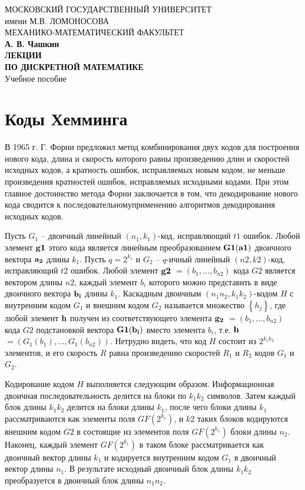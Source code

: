 \documentclass[12pt]{article}
\numberwithin{equation}{section}
\begin{document}
\begin{center}
\hfill \break
\large{МОСКОВСКИЙ ГОСУДАРСТВЕННЫЙ УНИВЕРСИТЕТ}\\
\footnotesize{имени М.В. ЛОМОНОСОВА}\\
\footnotesize{МЕХАНИКО-МАТЕМАТИЧЕСКИЙ ФАКУЛЬТЕТ}\\
\hfill \break
\small{\textbf{А. В. Чашкин}}\\
\small{\textbf{ЛЕКЦИИ}}\\
\small{\textbf{ПО ДИСКРЕТНОЙ МАТЕМАТИКЕ}}\\
\hfill \break
\normalsize{Учебное пособие}\
\end{center}
\newpage	
	\tableofcontents
	\newpage

	\section{Коды Хемминга}
	
	В 1965 г. Г. Форни предложил метод комбинирования двух кодов для построения нового кода, длина и скорость которого равны произведению длин и скоростей исходных кодов, а кратность ошибок, исправляемых новым кодом, не меньше произведения кратностей ошибок, исправляемых исходными кодами. При этом главное достоинство метода Форни заключается в том, что декодирование нового кода сводится к последовательномуприменению алгоритмов декодирования исходных кодов.
	
	
	Пусть $G_1$ -- двоичный линейный $(n_1, k_1)$-код, исправляющий $t1$ ошибок. Любой элемент $\bf g1$ этого кода является линейным преобразованием $\bf G1(a1)$ двоичного вектора $\bf a_2$ длины $k_1$. Пусть $q = 2^{{k}_{1}}$ и $G_2$ -- $q$-ичный линейный $(n2, k2)$-код, исправляющий $t2$ ошибок. Любой элемент $\bf g2$ $= (b_1,...,b_{n2} )$ кода $G2$ является вектором длины $n2$, каждый элемент $b_i$ которого можно представить в виде двоичного вектора $\bf b_i$ длины $k_1$. Каскадным двоичным
	$(n_1n_2, k_1k_2)$-кодом $H$ с внутренним кодом $G_1$ и внешним кодом $G_2$ называется множество $\left\{{h}_{j}\right\}$, где любой элемент $\bf h$ получен из соответствующего элемента $\bf g_2$ 
	$= (b_1,...,{{b}_{n2}} )$ кода $G2$ подстановкой вектора $\bf G1(b_i)$ вместо элемента $b_i$, т.е. $\bf h$ $= (G_1(b_1),...,G_1({{b}_{n2}} ))$. Нетрудно видеть, что код $H$ состоит из $2^{k_1k_2}$ элементов, и его скорость $R$ равна произведению скоростей $R_1$ и $R_2$ кодов $G_1$ и $G_2$.
	
	Кодирование кодом
	$H$ выполняется следующим образом. Информационная двоичная последовательность делится на блоки по $k_1k_2$ символов. Затем каждый блок длины $k_1k_2$ делится на блоки длины $k_1$, после чего блоки
	длины $k_1$ рассматриваются как элементы поля $GF(2^{{k}_{1}})$, и $k2$ таких блоков кодируются внешним кодом
	$G2$ в состоящие из элементов поля $GF(2^{{k}_{1}})$
	блоки длины
	$n_2$. Наконец, каждый элемент $GF(2^{{k}_{1}})$ в таком блоке рассматривается как двоичный вектор длины $k_1$ и кодируется внутренним кодом $G_1$ в двоичный вектор длины
	$n_1$. В результате исходный двоичный блок
	длины $k_1k_2$ преобразуется в двоичный блок длины $n_1n_2$.
	
\end{document}
